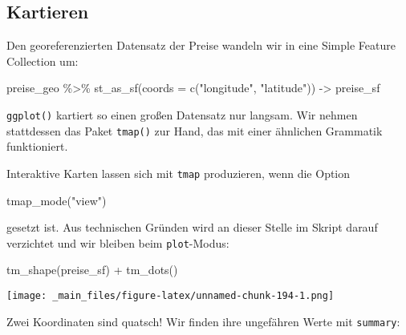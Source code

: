 \documentclass[
  ngerman,
]{article}
\newenvironment{Shaded}{\begin{snugshade}}{\end{snugshade}}
\newcommand{\AttributeTok}[1]{\textcolor[rgb]{0.77,0.63,0.00}{#1}}
\newcommand{\DocumentationTok}[1]{\textcolor[rgb]{0.56,0.35,0.01}{\textbf{\textit{#1}}}}
\newcommand{\FunctionTok}[1]{\textcolor[rgb]{0.00,0.00,0.00}{#1}}
\newcommand{\NormalTok}[1]{#1}
\newcommand{\OtherTok}[1]{\textcolor[rgb]{0.56,0.35,0.01}{#1}}
\newcommand{\SpecialCharTok}[1]{\textcolor[rgb]{0.00,0.00,0.00}{#1}}
\newcommand{\StringTok}[1]{\textcolor[rgb]{0.31,0.60,0.02}{#1}}
\begin{document}
\hypertarget{kartieren}{%
\subsection{Kartieren}\label{kartieren}}

Den georeferenzierten Datensatz der Preise wandeln wir in eine Simple Feature Collection um:

\begin{Shaded}
\begin{Highlighting}[]
\NormalTok{preise\_geo }\SpecialCharTok{\%\textgreater{}\%}
  \FunctionTok{st\_as\_sf}\NormalTok{(}\AttributeTok{coords =} \FunctionTok{c}\NormalTok{(}\StringTok{"longitude"}\NormalTok{, }\StringTok{"latitude"}\NormalTok{)) }\OtherTok{{-}\textgreater{}}\NormalTok{ preise\_sf}
\end{Highlighting}
\end{Shaded}

\texttt{ggplot()} kartiert so einen großen Datensatz nur langsam. Wir nehmen stattdessen das Paket \texttt{tmap()} zur Hand, das mit einer ähnlichen Grammatik funktioniert.

Interaktive Karten lassen sich mit \texttt{tmap} produzieren, wenn die Option

\begin{Shaded}
\begin{Highlighting}[]
\FunctionTok{tmap\_mode}\NormalTok{(}\StringTok{"view"}\NormalTok{)}
\end{Highlighting}
\end{Shaded}

gesetzt ist. Aus technischen Gründen wird an dieser Stelle im Skript darauf verzichtet und wir bleiben beim \texttt{plot}-Modus:

\begin{Shaded}
\begin{Highlighting}[]
\FunctionTok{tm\_shape}\NormalTok{(preise\_sf) }\SpecialCharTok{+}
  \FunctionTok{tm\_dots}\NormalTok{()}
\end{Highlighting}
\end{Shaded}

\texttt{[image: \_main\_files/figure-latex/unnamed-chunk-194-1.png]}

Zwei Koordinaten sind quatsch! Wir finden ihre ungefähren Werte mit \texttt{summary}:

\begin{Shaded}
\end{Shaded}
\end{document}
